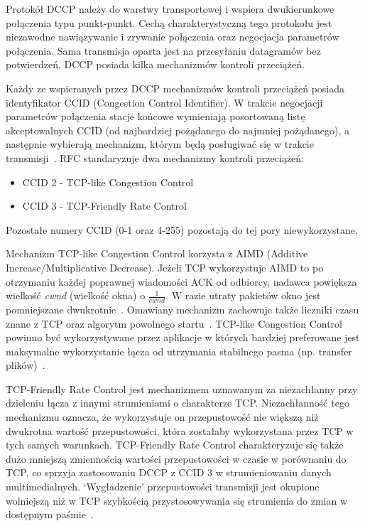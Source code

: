 Protokół DCCP należy do warstwy transportowej i wspiera dwukierunkowe połączenia typu punkt-punkt. Cechą charakterystyczną tego protokołu jest niezawodne nawiązywanie i zrywanie połączenia oraz negocjacja parametrów połączenia. Sama transmisja oparta jest na przesyłaniu datagramów bez potwierdzeń. DCCP posiada kilka mechanizmów kontroli przeciążeń.

Każdy ze wspieranych przez DCCP mechanizmów kontroli przeciążeń posiada identyfikator CCID (Congestion Control Identifier). W trakcie negocjacji parametrów połączenia stacje końcowe wymieniają posortowaną listę akceptowalnych CCID (od najbardziej pożądanego do najmniej pożądanego), a następnie wybierają mechanizm, którym będą posługiwać się w trakcie transmisji~\cite{RFC5762}. RFC standaryzuje dwa mechanizmy kontroli przeciążeń:
\begin{itemize}
  \item CCID 2 - TCP-like Congestion Control
  \item CCID 3 - TCP-Friendly Rate Control
\end{itemize}
Pozostałe numery CCID (0-1 oraz 4-255) pozostają do tej pory niewykorzystane.

Mechanizm TCP-like Congestion Control korzysta z AIMD (Additive Increase/Multiplicative Decrease). Jeżeli TCP wykorzystuje AIMD to po otrzymaniu każdej poprawnej wiadomości ACK od odbiorcy, nadawca powiększa wielkość \textit{cwnd} (wielkość okna) o $\frac{1}{cwnd}$. W razie utraty pakietów okno jest pomniejszane dwukrotnie~\cite{Stevens}. Omawiany mechanizm zachowuje także liczniki czasu znane z TCP oraz algorytm powolnego startu~\cite{RFC2581}. TCP-like Congestion Control powinno być wykorzystywane przez aplikacje w których bardziej preferowane jest maksymalne wykorzystanie łącza od utrzymania stabilnego pasma (np. transfer plików)~\cite{RFC4341}.

TCP-Friendly Rate Control jest mechanizmem uznawanym za niezachłanny przy dzieleniu łącza z innymi strumieniami o charakterze TCP. Niezachłanność tego mechanizmu oznacza, że wykorzystuje on przepustowość nie większą niż dwukrotna wartość przepustowości, która zostałaby wykorzystana przez TCP w tych samych warunkach. TCP-Friendly Rate Control charakteryzuje się także dużo mniejszą zmiennością wartości przepustowości w czasie w porównaniu do TCP, co sprzyja zastosowaniu DCCP z CCID 3 w strumieniowaniu danych multimedialnych. `Wygładzenie' przepustowości transmisji jest okupione wolniejszą niż w TCP szybkością przystosowywania się strumienia do zmian w dostępnym paśmie~\cite{RFC5348}.


